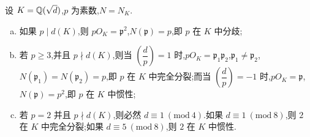 \begin{theorem}\label{thm:2.8}
设 $K=\mathbb{Q}(\sqrt{d})$,$p$ 为素数,$N=N_K$.
\begin{enumerate}[(a)]
  \item 如果 $p\mid d(K)$,则 $pO_K=\mathfrak{p}^2$,$N(\mathfrak{p})=p$,即 $p$ 在 $K$ 中分歧;
  \item 若 $p\geqslant 3$,并且 $p\nmid d(K)$,则当 $\left(\dfrac{d}{p}\right)=1$ 时,$pO_K=\mathfrak{p}_1\mathfrak{p}_2$,$\mathfrak{p}_1\neq\mathfrak{p}_2$,$N(\mathfrak{p}_1)=N(\mathfrak{p}_2)=p$,即 $p$ 在 $K$ 中完全分裂;而当 $\left(\dfrac{d}{p}\right)=-1$ 时,$pO_K=\mathfrak{p}$,$N(\mathfrak{p})=p^2$,即 $p$ 在 $K$ 中惯性;
  \item 若 $p=2$ 并且 $p\nmid d(K)$,则必然 $d\equiv 1\ (\mathrm{mod}\ 4)$.如果 $d\equiv 1\ (\mathrm{mod}\ 8)$,则 $2$ 在 $K$ 中完全分裂;如果 $d\equiv 5\ (\mathrm{mod}\ 8)$,则 $2$ 在 $K$ 中惯性.
\end{enumerate}
\end{theorem}

